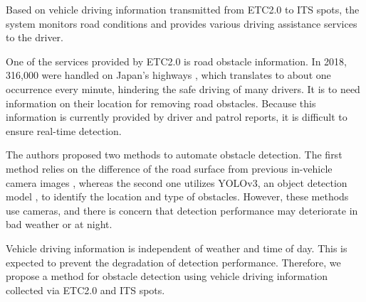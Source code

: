 \documentclass[paper]{ieice}
\begin{document}
%
Based on vehicle driving information transmitted from ETC2.0 to ITS spots, the system monitors road conditions and provides various driving assistance services to the driver.
%
\par
%
One of the services provided by ETC2.0 is road obstacle information.
%
In 2018, 316,000 were handled on Japan's highways \cite{obstacles}, which translates to about one occurrence every minute, hindering the safe driving of many drivers.
%
It is to need information on their location for removing road obstacles.
%
Because this information is currently provided by driver and patrol reports, it is difficult to ensure real-time detection.
%
\par
%
The authors proposed two methods to automate obstacle detection.
%
The first method relies on the difference of the road surface from previous in-vehicle camera images \cite{hisatoku}, whereas the second one utilizes YOLOv3, an object detection model \cite{wang2021front}, to identify the location and type of obstacles.
%
However, these methods use cameras, and there is concern that detection performance may deteriorate in bad weather or at night.
%
\par
%
Vehicle driving information is independent of weather and time of day.
%
This is expected to prevent the degradation of detection performance.
%
Therefore, we propose a method for obstacle detection using vehicle driving information collected via ETC2.0 and ITS spots.
%
\end{document}
